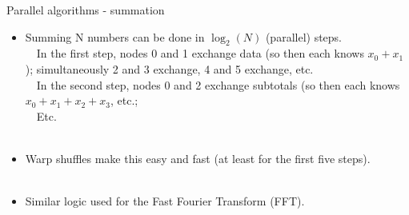 \documentclass[usenames,dvipsnames]{beamer}
\begin{document}
\begin{frame}{Parallel algorithms - summation}
  \begin{block}{}
    \begin{itemize}
      \item{Summing N numbers can be done in $\log_2(N)$ (parallel) steps.\\~\
      In the first step, nodes 0 and 1 exchange data (so then each knows $x_0 + x_1$); simultaneously 2 and 3 exchange, 4 and 5 exchange, etc.\\~\
      In the second step, nodes 0 and 2 exchange subtotals (so then each knows $x_0 + x_1 + x_2 + x_3$, etc.;\\~\
      Etc.}\\~\
      \item{Warp shuffles make this easy and fast (at least for the first five steps).}\\~\
      \item{Similar logic used for the Fast Fourier Transform (FFT).}
    \end{itemize}
  \end{block}
\end{frame}
\end{document}
